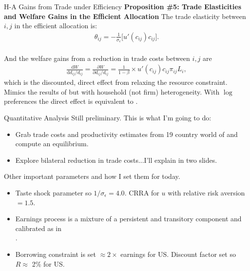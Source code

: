 \documentclass[9pt,pdftex,aspectratio=1610]{beamer}
\theoremstyle{definition}
\begin{document}
\begin{frame}[t]{H-A Gains from Trade under Efficiency}
\smallskip
\textbf{Proposition \#5: Trade Elasticities and Welfare Gains in the Efficient Allocation} The trade elasticity between $i,j$ in the efficient allocation is:
\begin{align}
\theta_{ij} =  -\frac{1}{\sigma_{\epsilon}} \bigg [ u'(c_{ij}) c_{ij} \bigg]. \nonumber
\end{align}\\
\bigskip
And the welfare gains from a reduction in trade costs between $i,j$ are
\begin{align}
\frac{\mathrm{d} W}{\mathrm{d} d_{ij} / d_{ij}} = \frac{\partial W}{\partial d_{ij} / d_{ij}} = \frac{1}{1-\beta} \times u'(c_{ij}) c_{ij} \pi_{ij} L_i, \nonumber
\end{align}
which is the discounted, direct effect from relaxing the resource constraint.\\
\bigskip
\medskip
Mimics the results of \citet{AtkesonBurstein2010} but with household (not firm) heterogeneity. With $\log$ preferences the direct effect is equivalent to \citet{arkolakis2012new}.\\
\bigskip

\end{frame}


\begin{frame}[t]{Quantitative Analysis}
\smallskip
Still preliminary. This is what I'm going to do:
\begin{itemize}
  \item Grab trade costs and productivity estimates from 19 country world of \citet{eaton2002technology} and compute an equilibrium.
\smallskip
  \item Explore bilateral reduction in trade costs...I'll explain in two slides.
\end{itemize}
\bigskip
Other important parameters and how I set them for today.
\begin{itemize}
\item Taste shock parameter so $1 / \sigma_{\epsilon} = 4.0$. CRRA for $u$ with relative risk aversion $= 1.5$.
\smallskip
\item Earnings process is a mixture of a persistent and transitory component and calibrated as in\\ \citet*{krueger2016macroeconomics}.
\smallskip
\item Borrowing constraint is set $\approx 2\times$ earnings for US. Discount factor set so $R \approx$ 2\% for US.
\end{itemize}
\end{frame}
\end{document}
